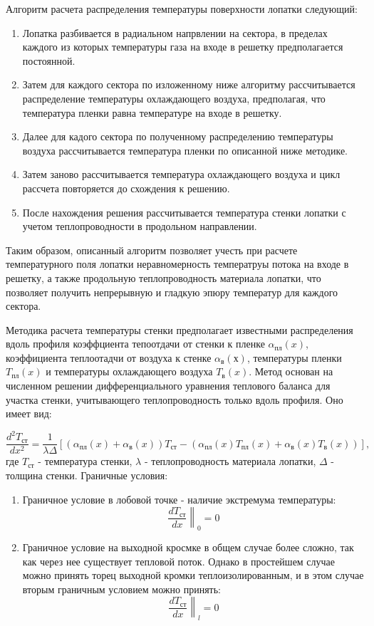 \documentclass[a4paper,10pt]{article}
\begin{document}
    Алгоритм расчета распределения температуры поверхности лопатки следующий:
    \begin{enumerate}
        \item Лопатка разбивается в радиальном напрвлении на сектора, в пределах каждого из которых
        температуры газа на входе в решетку предполагается постоянной.
        \item Затем для каждого сектора по изложенному ниже алгоритму рассчитывается распределение температуры
        охлаждающего воздуха, предполагая, что температура пленки равна температуре на входе в решетку.
        \item Далее для кадого сектора по полученному распределению температуры воздуха рассчитывается
        температура пленки по описанной ниже методике.
        \item Затем заново рассчитывается температура охлаждающего воздуха и цикл рассчета повторяется до схождения к решению.
        \item После нахождения решения рассчитывается температура стенки лопатки с учетом теплопроводности в продольном направлении.
    \end{enumerate}
    Таким образом, описанный алгоритм позволяет учесть при расчете температурного поля лопатки неравномерность
    температруы  потока на входе в решетку, а также продольную теплопроводность материала лопатки, что позволяет
    получить непрерывную и гладкую эпюру температур для каждого сектора.

    Методика расчета температуры стенки предполагает известными распределения вдоль профиля коэффциента
    тепоотдачи от стенки к пленке $\alpha_{пл}(x)$, коэффициента теплоотадчи от воздуха к стенке $\alpha_в(х)$,
    температуры пленки $T_{пл}(x)$ и температуры охлаждающего воздуха $T_в(x)$.
    Метод основан на численном решении дифференциального уравнения теплового баланса для участка стенки,
    учитывающего теплопроводность только вдоль профиля.
    Оно имеет вид:

    \[
        \frac{d^2 T_{ст}}{dx^2} = \frac{1}{\lambda \Delta} \left[
                    \left( \alpha_{пл}(x) + \alpha_в(x) \right) T_{ст} -
                    \left( \alpha_{пл}(x) T_{пл}(x) + \alpha_в(x) T_в(x) \right)
        \right],
    \]
    где $T_{ст}$ - температура стенки, $\lambda$ - теплопроводность материала лопатки, $\Delta$ - толщина стенки.
    Граничные условия:

    \begin{enumerate}
        \item Граничное условие в лобовой точке - наличие экстремума температуры:
        \[
            \left. \frac{dT_{ст}}{dx} \right\|_0 = 0
        \]

        \item Граничное условие на выходной кросмке в общем случае более сложно, так как через нее
        существует тепловой поток. Однако в простейшем случае можно принять торец выходной кромки теплоизолированным,
        и в этом случае вторым граничным условием можно принять:
        \[
            \left. \frac{dT_{ст}}{dx} \right\|_l = 0
        \]
    \end{enumerate}
\end{document}
